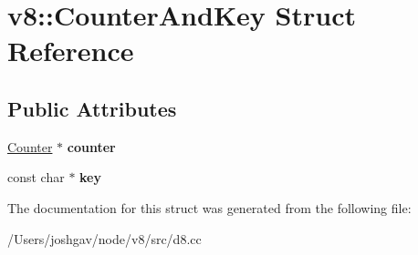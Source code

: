 \hypertarget{structv8_1_1_counter_and_key}{}\section{v8\+:\+:Counter\+And\+Key Struct Reference}
\label{structv8_1_1_counter_and_key}
\subsection*{Public Attributes}
\begin{DoxyCompactItemize}
\item 
\hyperlink{classv8_1_1_counter}{Counter} $\ast$ {\bfseries counter}\hypertarget{structv8_1_1_counter_and_key_aa2d9bb18791cf1e45607f17b3dc48d36}{}\label{structv8_1_1_counter_and_key_aa2d9bb18791cf1e45607f17b3dc48d36}

\item 
const char $\ast$ {\bfseries key}\hypertarget{structv8_1_1_counter_and_key_af22129bbaba86a7188a30995db746bb9}{}\label{structv8_1_1_counter_and_key_af22129bbaba86a7188a30995db746bb9}

\end{DoxyCompactItemize}


The documentation for this struct was generated from the following file\+:\begin{DoxyCompactItemize}
\item 
/\+Users/joshgav/node/v8/src/d8.\+cc\end{DoxyCompactItemize}
